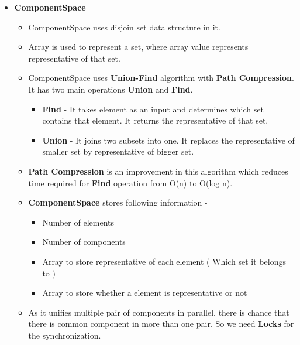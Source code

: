 \documentclass{article}
\begin{document}
\begin{itemize}
\item \textbf{ComponentSpace}

\begin{itemize}
\item ComponentSpace uses disjoin set data structure in it. \\
\item Array is used to represent a set, where array value represents representative of that set.
\item ComponentSpace uses \textbf{Union-Find} algorithm with \textbf{Path Compression}. It has two main operations \textbf{Union} and \textbf{Find}.
\begin{itemize}
\item \textbf{Find} - It takes element as an input and determines which set contains that element. It returns the representative of that set.
\item \textbf{Union} - It joins two subsets into one. It replaces the representative of smaller set by representative of bigger set. \\
\end{itemize}
\item \textbf{Path Compression} is an improvement in this algorithm which reduces time required for \textbf{Find} operation from O(n) to O(log n). \\
\item \textbf{ComponentSpace} stores following information -
\begin{itemize}
\item Number of elements
\item Number of components
\item Array to store representative of each element ( Which set it belongs to )
\item Array to store whether a element is representative or not  \\
\end{itemize}
\item As it unifies multiple pair of components in parallel, there is chance that there is common component in more than one pair. So we need \textbf{Locks} for the synchronization.\\ 
\end{itemize}

\end{itemize}

\end{document}
